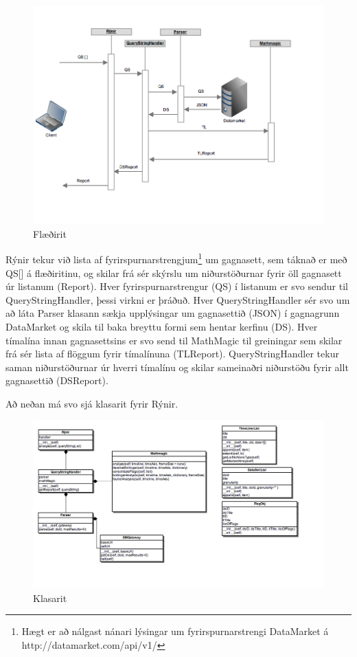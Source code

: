 \documentclass{article}
\begin{document}
\begin{figure}[H]
  \centering
  \includegraphics[width=.95\textwidth]{rynir_sequence-2.png} 
  \caption{Flæðirit} 
\end{figure}
Rýnir tekur við lista af fyrirspurnarstrengjum\footnote[1]{Hægt er að nálgast nánari lýsingar um fyrirspurnarstrengi DataMarket á http://datamarket.com/api/v1/} 
um gagnasett, sem táknað er með QS[] á flæðiritinu, og skilar frá sér skýrslu um niðurstöðurnar fyrir öll
gagnasett úr listanum (Report). Hver fyrirspurnarstrengur (QS) í listanum er svo
sendur til QueryStringHandler, þessi virkni er þráðuð. Hver
QueryStringHandler sér svo um að láta Parser klasann sækja upplýsingar um
gagnasettið (JSON) í gagnagrunn DataMarket og skila til baka breyttu formi sem
hentar kerfinu (DS). Hver tímalína innan gagnasettsins er svo send til MathMagic
til greiningar sem skilar frá sér lista af flöggum fyrir tímalínuna (TLReport).
QueryStringHandler tekur saman niðurstöðurnar úr hverri tímalínu og skilar
sameinaðri niðurstöðu fyrir allt gagnasettið (DSReport).

Að neðan má svo sjá klasarit fyrir Rýnir.

\begin{figure}[H]
  \centering
  \includegraphics[width=.95\textwidth]{rynir_class_diagram.png} 
  \caption{Klasarit} 
\end{figure}
\end{document}
